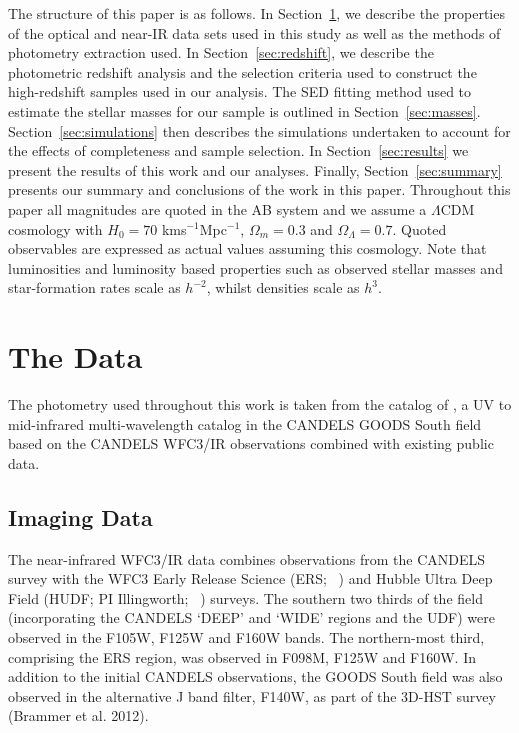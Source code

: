The structure of this paper is as follows. In Section~\ref{sec:data}, we describe the properties of the optical and near-IR data sets used in this study as well as the methods of photometry extraction used. In Section~\ref{sec:redshift}, we describe the photometric redshift analysis and the selection criteria used to construct the high-redshift samples used in our analysis. The SED fitting method used to estimate the stellar masses for our sample is outlined in Section~\ref{sec:masses}. Section~\ref{sec:simulations} then describes the simulations undertaken to account for the effects of completeness and sample selection. In Section~\ref{sec:results} we present the results of this work and our analyses. Finally, Section~\ref{sec:summary} presents our summary and conclusions of the work in this paper.
Throughout this paper all magnitudes are quoted in the AB system \citep{1983ApJ...266..713O} and we assume a $\Lambda$CDM cosmology with $H_{0} = 70$ kms$^{-1}$Mpc$^{-1}$, $\Omega_{m}=0.3$ and $\Omega_{\Lambda}=0.7$. Quoted observables are expressed as actual values assuming this cosmology. Note that luminosities and luminosity based properties such as observed stellar masses and star-formation rates scale as $h^{-2}$, whilst densities scale as $h^{3}$.

\section{The Data}\label{sec:data}
The photometry used throughout this work is taken from the catalog of \citet{Guo:2013ig}, a UV to mid-infrared multi-wavelength catalog in the CANDELS GOODS South field based on the CANDELS WFC3/IR observations combined with existing public data.

\subsection{Imaging Data}
The near-infrared WFC3/IR data combines observations from the CANDELS survey \citep{2011ApJS..197...35G,Koekemoer:2011br} with the WFC3 Early Release Science (ERS; \citeauthor{2011ApJS..193...27W}~\citeyear{2011ApJS..193...27W}) and Hubble Ultra Deep Field (HUDF; PI Illingworth; \citeauthor{Bouwens:2010dk}~\citeyear{Bouwens:2010dk}) surveys. The southern two thirds of the field (incorporating the CANDELS `DEEP' and `WIDE' regions and the UDF) were observed in the F105W, F125W and F160W bands. The northern-most third, comprising the ERS region, was observed in F098M, F125W and F160W. In addition to the initial CANDELS observations, the GOODS South field was also observed in the alternative J band filter, F140W, as part of the 3D-HST survey (Brammer et al. 2012).

